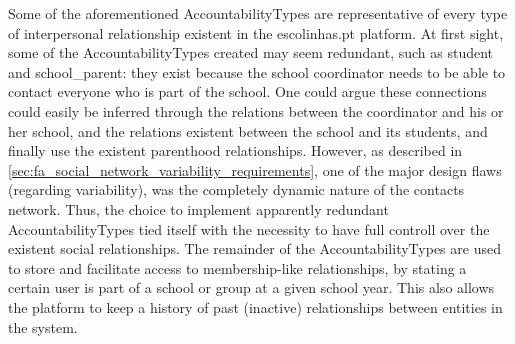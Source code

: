 
Some of the aforementioned AccountabilityTypes are representative of every type of interpersonal relationship existent in the escolinhas.pt platform. At first sight, some of the AccountabilityTypes created may seem redundant, such as student and school\_parent: they exist because the school coordinator needs to be able to contact everyone who is part of the school. One could argue these connections could easily be inferred through the relations between the coordinator and his or her school, and the relations existent between the school and its students, and finally use the existent parenthood relationships. However, as described in \ref{sec:fa_social_network_variability_requirements}, one of the major design flaws (regarding variability), was the completely dynamic nature of the contacts network. Thus, the choice to implement apparently redundant AccountabilityTypes tied itself with the necessity to have full controll over the existent social relationships. The remainder of the AccountabilityTypes are used to store and facilitate access to membership-like relationships, by stating a certain user is part of a school or group at a given school year. This also allows the platform to keep a history of past (inactive) relationships between entities in the system.

